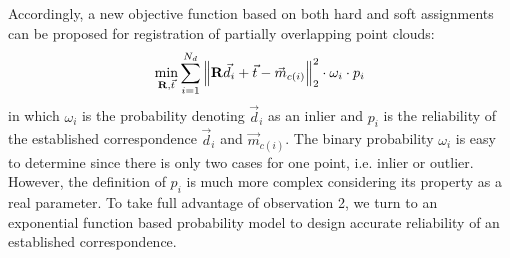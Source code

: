 \documentclass[review]{elsarticle}
\begin{document}
Accordingly, a new objective function based on both hard and soft assignments can be proposed for registration of partially overlapping point clouds:
\begin{equation}
{\mathop {\min }\limits_{{\bf{R}},\vec t } \sum\limits_{i = 1}^{{N_d}} {\left\| {{\bf{R}}{{\vec d }_i} + \vec t  - {{\vec m }_{c\left( i \right)}}} \right\|} _2^2 \cdot {\omega _i} \cdot {p_i}}
\label{eq:ProObj}
\end{equation}
in which ${\omega _i}$ is the probability denoting ${\vec d _i}$ as an inlier and ${p_i}$ is the reliability of the established correspondence ${\vec d _i}$ and ${\vec m _{c\left( i \right)}}$. The binary probability ${\omega _i}$ is easy to determine since there is only two cases for one point, i.e. inlier or outlier. However, the definition of ${p_i}$ is much more complex considering its property as a real parameter. To take full advantage of observation 2, we turn to an exponential function based probability model to design accurate reliability of an established correspondence.
\end{document}
